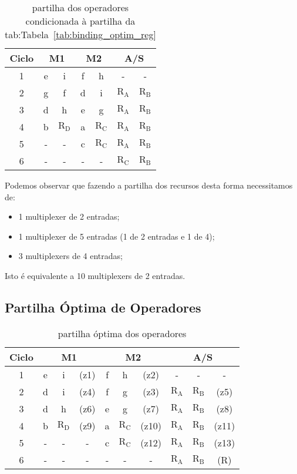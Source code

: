 \documentclass[a4paper]{article}
\begin{document}
\begin{table}[H]
\centering
\begin{tabular}{|c||cc|cc|cc|}
\hline 
Ciclo & \multicolumn{2}{c|}{M1} & \multicolumn{2}{c|}{M2} & \multicolumn{2}{c|}{A/S} \\ 
\hline 
\hline
1 & e & i & f & h & - & - \\ 
\hline 
2 & g & f & d & i & $\mathrm{R_A}$ & $\mathrm{R_B}$ \\ 
\hline 
3 & d & h & e & g & $\mathrm{R_A}$ & $\mathrm{R_B}$ \\ 
\hline 
4 & b & $\mathrm{R_D}$ & a & $\mathrm{R_C}$ & $\mathrm{R_A}$ & $\mathrm{R_B}$ \\ 
\hline 
5 & - & - & c & $\mathrm{R_C}$ & $\mathrm{R_A}$ & $\mathrm{R_B}$ \\ 
\hline 
6 & - & - & - & - & $\mathrm{R_C}$ & $\mathrm{R_B}$ \\ 
\hline 
\end{tabular}
\caption{partilha dos operadores condicionada à partilha da \mbox{tab:Tabela~\ref{tab:binding_optim_reg}}}
\label{tab:binding_operadores}
\end{table}

Podemos observar que fazendo a partilha dos recursos desta forma necessitamos de:
\begin{itemize}
\item 1 multiplexer de 2 entradas;
\item 1 multiplexer de 5 entradas (1 de 2 entradas e 1 de 4);
\item 3 multiplexers de 4 entradas;
\end{itemize}
Isto é equivalente a 10 multiplexers de 2 entradas.

\subsection{Partilha Óptima de Operadores}

\begin{table}[H]
\centering
\begin{tabular}{|c||ccc|ccc|ccc|}
\hline 
Ciclo & \multicolumn{3}{c|}{M1} & \multicolumn{3}{c|}{M2} & \multicolumn{3}{c|}{A/S} \\ 
\hline 
\hline 
1 & e & i & (z1) & f & h & (z2) & - & - & - \\ 
\hline 
2 & d & i & (z4) & f & g & (z3) & $\mathrm{R_A}$ & $\mathrm{R_B}$ & (z5) \\
\hline 
3 & d & h & (z6) & e & g & (z7) & $\mathrm{R_A}$ & $\mathrm{R_B}$ & (z8) \\ 
\hline 
4 & b & $\mathrm{R_D}$ & (z9) & a & $\mathrm{R_C}$ & (z10) & $\mathrm{R_A}$ & $\mathrm{R_B}$ & (z11) \\ 
\hline 
5 & - & - & - & c & $\mathrm{R_C}$ & (z12) & $\mathrm{R_A}$ & $\mathrm{R_B}$ & (z13) \\ 
\hline 
6 & - & - & - & - & - & - & $\mathrm{R_A}$ & $\mathrm{R_B}$ & (R) \\ 
\hline 
\end{tabular} 
\caption{partilha óptima dos operadores}
\label{tab:binding_optim_oper}
\end{table}
\end{document}
